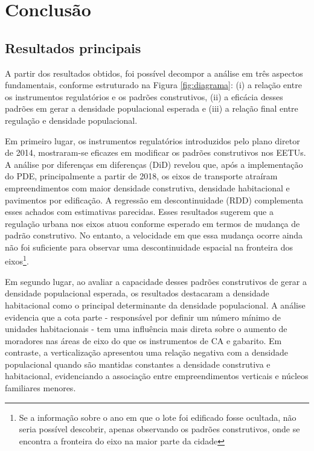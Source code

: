 \chapter{Conclusão}
\label{chp:conclusao}

\section{Resultados principais}
\label{sec:conclusao}

A partir dos resultados obtidos, foi possível decompor a análise em três aspectos fundamentais, conforme estruturado na Figura \ref{fig:diagrama}: (i) a relação entre os instrumentos regulatórios e os padrões construtivos, (ii) a eficácia desses padrões em gerar a densidade populacional esperada e (iii) a relação final entre regulação e densidade populacional.

Em primeiro lugar, os instrumentos regulatórios introduzidos pelo plano diretor de 2014, mostraram-se eficazes em modificar os padrões construtivos nos EETUs. A análise por diferenças em diferenças (DiD) revelou que, após a implementação do PDE, principalmente a partir de 2018, os eixos de transporte atraíram empreendimentos com maior densidade construtiva, densidade habitacional e pavimentos por edificação. A regressão em descontinuidade (RDD) complementa esses achados com estimativas parecidas. Esses resultados sugerem que a regulação urbana nos eixos atuou conforme esperado em termos de mudança de padrão construtivo. No entanto, a velocidade em que essa mudança ocorre ainda não foi suficiente para observar uma descontinuidade espacial na fronteira dos eixos\footnote{Se a informação sobre o ano em que o lote foi edificado fosse ocultada, não seria possível descobrir, apenas observando os padrões construtivos, onde se encontra a fronteira do eixo na maior parte da cidade}.

Em segundo lugar, ao avaliar a capacidade desses padrões construtivos de gerar a densidade populacional esperada, os resultados destacaram a densidade habitacional como o principal determinante da densidade populacional. A análise evidencia que a cota parte - responsável por definir um número mínimo de unidades habitacionais - tem uma influência mais direta sobre o aumento de moradores nas áreas de eixo do que os instrumentos de CA e gabarito. Em contraste, a verticalização apresentou uma relação negativa com a densidade populacional quando são mantidas constantes a densidade construtiva e habitacional, evidenciando a associação entre empreendimentos verticais e núcleos familiares menores. 


